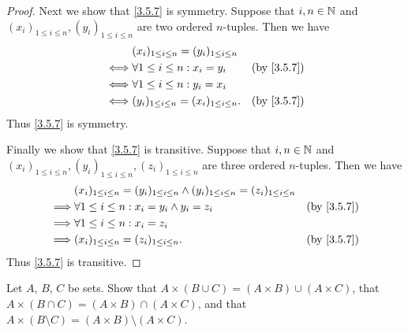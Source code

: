 \begin{proof}
  Next we show that \cref{3.5.7} is symmetry.
  Suppose that \(i, n \in \mathbb{N}\) and \((x_i)_{1 \leq i \leq n}, (y_i)_{1 \leq i \leq n}\) are two ordered \(n\)-tuples.
  Then we have
  \begin{align*}
         & (x_i)_{1 \leq i \leq n} = (y_i)_{1 \leq i \leq n}                             \\
    \iff & \forall 1 \leq i \leq n : x_i = y_i                & \text{(by \cref{3.5.7})} \\
    \iff & \forall 1 \leq i \leq n : y_i = x_i                                           \\
    \iff & (y_i)_{1 \leq i \leq n} = (x_i)_{1 \leq i \leq n}. & \text{(by \cref{3.5.7})}
  \end{align*}
  Thus \cref{3.5.7} is symmetry.

  Finally we show that \cref{3.5.7} is transitive.
  Suppose that \(i, n \in \mathbb{N}\) and \((x_i)_{1 \leq i \leq n}, (y_i)_{1 \leq i \leq n}, (z_i)_{1 \leq i \leq n}\) are three ordered \(n\)-tuples.
  Then we have
  \begin{align*}
             & (x_i)_{1 \leq i \leq n} = (y_i)_{1 \leq i \leq n} \land (y_i)_{1 \leq i \leq n} = (z_i)_{1 \leq i \leq n}                            \\
    \implies & \forall 1 \leq i \leq n : x_i = y_i \land y_i = z_i                                                       & \text{(by \cref{3.5.7})} \\
    \implies & \forall 1 \leq i \leq n : x_i = z_i                                                                                                  \\
    \implies & (x_i)_{1 \leq i \leq n} = (z_i)_{1 \leq i \leq n}.                                                        & \text{(by \cref{3.5.7})}
  \end{align*}
  Thus \cref{3.5.7} is transitive.
\end{proof}

\begin{ex}\label{ex:3.5.4}
  Let \(A\), \(B\), \(C\) be sets.
  Show that \(A \times (B \cup C) = (A \times B) \cup (A \times C)\), that \(A \times (B \cap C) = (A \times B) \cap (A \times C)\), and that \(A \times (B \setminus C) = (A \times B) \setminus (A \times C)\).
\end{ex}

